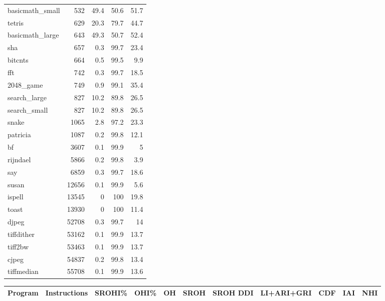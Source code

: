 \begin{tabular}{lrrrr}
 basicmath\_small &     532 &   49.4 &         50.6 &    51.7 \\
 tetris          &     629 &   20.3 &         79.7 &    44.7 \\
 basicmath\_large &     643 &   49.3 &         50.7 &    52.4 \\
 sha             &     657 &    0.3 &         99.7 &    23.4 \\
 bitcnts         &     664 &    0.5 &         99.5 &     9.9 \\
 fft             &     742 &    0.3 &         99.7 &    18.5 \\
 2048\_game       &     749 &    0.9 &         99.1 &    35.4 \\
 search\_large    &     827 &   10.2 &         89.8 &    26.5 \\
 search\_small    &     827 &   10.2 &         89.8 &    26.5 \\
 snake           &    1065 &    2.8 &         97.2 &    23.3 \\
 patricia        &    1087 &    0.2 &         99.8 &    12.1 \\
 bf              &    3607 &    0.1 &         99.9 &     5   \\
 rijndael        &    5866 &    0.2 &         99.8 &     3.9 \\
 say             &    6859 &    0.3 &         99.7 &    18.6 \\
 susan           &   12656 &    0.1 &         99.9 &     5.6 \\
 ispell          &   13545 &    0   &        100   &    19.8 \\
 toast           &   13930 &    0   &        100   &    11.4 \\
 djpeg           &   52708 &    0.3 &         99.7 &    14   \\
 tiffdither      &   53162 &    0.1 &         99.9 &    13.7 \\
 tiff2bw         &   53463 &    0.1 &         99.9 &    13.7 \\
 cjpeg           &   54837 &    0.2 &         99.8 &    13.4 \\
 tiffmedian      &   55708 &    0.1 &         99.9 &    13.6 \\
\hline
\end{tabular}\begin{tabular}{lrrrrrrrrrr}
\hline
 Program         &   Instructions &   SROHI\% &   OHI\% &   OH &   SROH &   SROH DDI &   LI+ARI+GRI &   CDF &   IAI &   NHI \\
\hline

\end{tabular}
